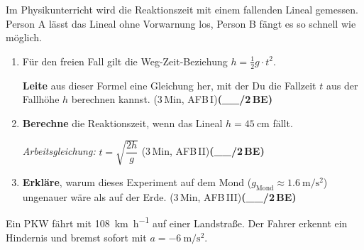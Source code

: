 \documentclass[11pt,a4paper]{article}
\newcommand{\BEZEIT}[3]{%
\hfill{\small\color{zeitgray}(#1\,Min, AFB\,#2)}\quad\textbf{(\_\_/#3\,BE)}%
}
\begin{document}
\noindent{}

\vspace{0.4cm}

Im Physikunterricht wird die Reaktionszeit mit einem fallenden Lineal gemessen. Person A lässt das Lineal ohne Vorwarnung los, Person B fängt es so schnell wie möglich.

\vspace{0.3cm}

\begin{enumerate}
\item[a)] Für den freien Fall gilt die Weg-Zeit-Beziehung $h = \frac{1}{2}g \cdot t^2$.

\textbf{Leite} aus dieser Formel eine Gleichung her, mit der Du die Fallzeit $t$ aus der Fallhöhe $h$ berechnen kannst. \BEZEIT{3}{I}{2}

\vspace{4cm}

\item[b)] \textbf{Berechne} die Reaktionszeit, wenn das Lineal $h = \SI{45}{\centi\metre}$ fällt.

\textit{Arbeitsgleichung:} $t = \sqrt{\dfrac{2h}{g}}$ \BEZEIT{3}{II}{2}

\vspace{5cm}

\item[c)] \textbf{Erkläre}, warum dieses Experiment auf dem Mond ($g_{\text{Mond}} \approx \SI{1,6}{\metre\per\second\squared}$) ungenauer wäre als auf der Erde. \BEZEIT{3}{III}{2}

\vspace{4cm}

\end{enumerate}

\newpage


\noindent{}

\vspace{0.4cm}

Ein PKW fährt mit \SI{108}{\kilo\metre\per\hour} auf einer Landstraße. Der Fahrer erkennt ein Hindernis und bremst sofort mit $a = \SI{-6}{\metre\per\second\squared}$.
\end{document}
